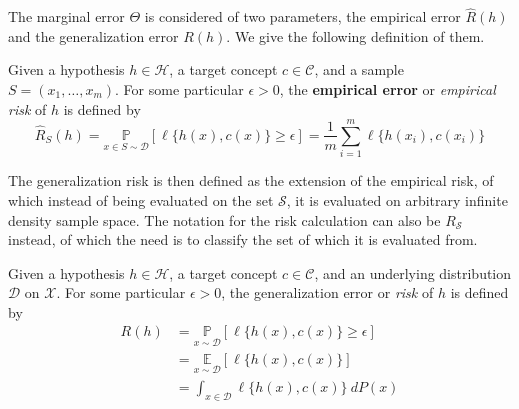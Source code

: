 The marginal error $\Theta$ is considered of two parameters, the empirical error $\hat{R}(h)$ and the generalization error $R(h)$. We give the following definition of them. 

\begin{definition}
    Given a hypothesis $h\in \mathcal{H}$, a target concept $c\in \mathcal{C}$, and a sample $S=(x_{1},\dots,x_{m})$. For some particular $\epsilon>0$, the \textbf{empirical error} or \textit{empirical risk} of $h$ is defined by\begin{equation}
        \hat{R}_{S}(h) = \underset{x\in S\sim\mathcal{D}}{\mathbb{P}} [\ell\{h(x),c(x)\}\geq \epsilon] =\frac{1}{m} \sum_{i=1}^{m} \ell\{h(x_i),c(x_i)\}
    \end{equation}
\end{definition}

The generalization risk is then defined as the extension of the empirical risk, of which instead of being evaluated on the set $\mathcal{S}$, it is evaluated on arbitrary infinite density sample space. The notation for the risk calculation can also be $R_{\mathcal{S}}$ instead, of which the need is to classify the set of which it is evaluated from. 

\begin{definition}
    Given a hypothesis $h\in\mathcal{H}$, a target concept $c\in\mathcal{C}$, and an underlying distribution $\mathcal{D}$ on $\mathcal{X}$. For some particular $\epsilon>0$, the generalization error or \textit{risk} of $h$ is defined by
    \begin{equation}
        \begin{split}
          R(h) 
          &= \underset{x\sim\mathcal{D}}{\mathbb{P}} [\ell\{h(x),c(x)\}\geq \epsilon]\\
          &= \underset{x\sim\mathcal{D}}{\mathbb{E}}[\ell\{h(x),c(x)\}]\\ 
          &= \int_{x\in \mathcal{D}} \ell\{h(x),c(x)\} \: dP(x)
        \end{split}
    \end{equation}
\end{definition}

